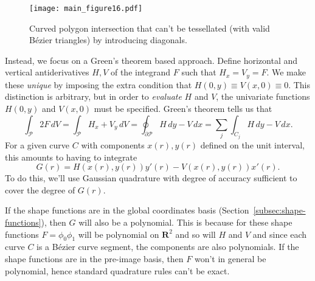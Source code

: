 \documentclass[letterpaper,10pt]{article}
\theoremstyle{definition}
\newcommand{\reals}{\mathbf{R}}
\begin{document}
\begin{figure}
  \texttt{[image: main\_figure16.pdf]}
  \centering
  \captionsetup{width=.75\linewidth}
  \caption{Curved polygon intersection that can't be tessellated
    (with valid B\'{e}zier triangles) by introducing diagonals.}
  \label{fig:bad-tessellation-required}
\end{figure}

Instead, we focus on a Green's theorem based approach.
Define horizontal and vertical antiderivatives
\(H, V\) of the integrand \(F\) such that \(H_x = V_y = F\).
We make these \emph{unique} by imposing the
extra condition that \(H(0, y) \equiv V(x, 0) \equiv 0\).
This distinction is arbitrary, but in order to \emph{evaluate}
\(H\) and \(V\), the univariate functions \(H(0, y)\) and \(V(x, 0)\)
must be specified.
Green's theorem tells us that
\begin{equation}
\int_{\mathcal{P}} 2 F \, dV =
\int_{\mathcal{P}} H_x + V_y \, dV =
\oint_{\partial \mathcal{P}} H \, dy - V \, dx =
\sum_j \int_{C_j} H \, dy - V \, dx.
\end{equation}
For a given curve \(C\) with components \(x(r), y(r)\)
defined on the unit interval, this amounts to having
to integrate
\begin{equation}
G(r) = H(x(r), y(r)) y'(r) - V(x(r), y(r)) x'(r).
\end{equation}
To do this, we'll use Gaussian
quadrature with degree of accuracy sufficient to cover the degree
of \(G(r)\).

If the shape functions are in the global coordinates basis
(Section~\ref{subsec:shape-functions}), then \(G\) will also be a polynomial.
This is because for these shape functions \(F = \phi_0 \phi_1\) will be
polynomial on \(\reals^2\) and so will \(H\) and \(V\) and since each curve
\(C\) is a B\'{e}zier curve segment, the components are also polynomials.
If the shape functions are in the pre-image basis, then \(F\) won't in general
be polynomial, hence standard quadrature rules can't be exact.
\end{document}
